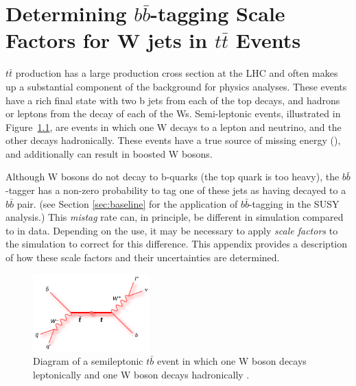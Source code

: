 \chapter{Determining $b\bar{b}$-tagging Scale Factors for W jets in $t\bar{t}$ Events}
\label{chap:bbsf}

$t\bar{t}$ production has a large production cross section at the LHC and often makes up a substantial component of the background for physics analyses. These events have a rich final state with two b jets from each of the top decays, and hadrons or leptons from the decay of each of the Ws. Semi-leptonic events, illustrated in Figure~\ref{fig:ttbar}, are events in which one W decays to a lepton and neutrino, and the other decays hadronically. These events have a true source of missing energy (\ptmiss), and additionally can result in boosted W bosons.

Although W bosons do not decay to b-quarks (the top quark is too heavy), the $b\bar{b}$-tagger has a non-zero probability to tag one of these jets as having decayed to a $b\bar{b}$ pair. (see Section \ref{sec:baseline} for the application of $b\bar{b}$-tagging in the SUSY analysis.) This \textit{mistag} rate can, in principle, be different in simulation compared to in data. Depending on the use, it may be necessary to apply \textit{scale factors} to the simulation to correct for this difference. This appendix provides a description of how these scale factors and their uncertainties are determined.

\begin{figure}
\centering
\includegraphics[width=0.4\textwidth]{figs/feynman_ttbar_ljets_beamline.png}
\caption[Diagram of a semileptonic $t\bar{b}$ event in which one W boson decays leptonically and one W boson decays hadronically.]{Diagram of a semileptonic $t\bar{b}$ event in which one W boson decays leptonically and one W boson decays hadronically \cite{ttbar}.}
\label{fig:ttbar}
\end{figure}

